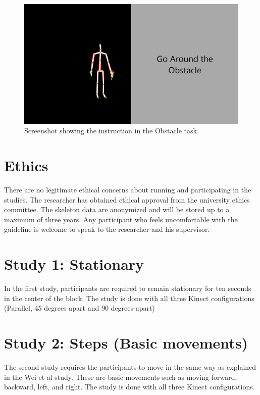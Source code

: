 \begin{figure}[!h]
  \centering

  \includegraphics[width=0.6\linewidth]{figs/obstacle_task_instruction}
  
  \caption{Screenshot showing the instruction in the Obstacle task.}

  \label{fig:obstacle_task_instruction}
\end{figure}

\section{Ethics}
\label{sec:studies_ethics}

There are no legitimate ethical concerns about running and participating in the studies. The researcher has obtained ethical approval from the university ethics committee. The skeleton data are anonymized and will be stored up to a maximum of three years. Any participant who feels uncomfortable with the guideline is welcome to speak to the researcher and his supervisor.

\section{Study 1: Stationary}
\label{sec:studies_stationary}

In the first study, participants are required to remain stationary for ten seconds in the center of the block. The study is done with all three Kinect configurations (Parallel, 45 degrees-apart and 90 degrees-apart)

\section{Study 2: Steps (Basic movements)}
\label{sec:studies_stationary}

The second study requires the participants to move in the same way as explained in the Wei et al study. These are basic movements such as moving forward, backward, left, and right. The study is done with all three Kinect configurations.

